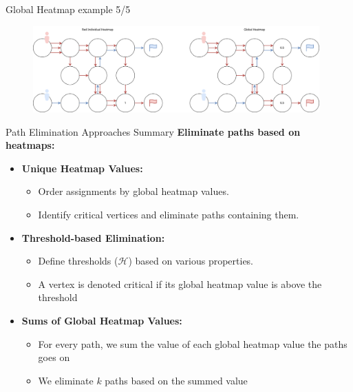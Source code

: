 \begin{frame}{Global Heatmap example 5/5}
    \begin{figure}[H]
        \centering
        \includegraphics[width=11cm]{img/global_heatmap_p5.drawio.png}
    \end{figure}
\end{frame}



\begin{frame}{Path Elimination Approaches Summary}
    \textbf{Eliminate paths based on heatmaps:}

            \begin{itemize}
                \item \textbf{Unique Heatmap Values:}
                    \begin{itemize}
                        \item Order assignments by global heatmap values.
                        \item Identify critical vertices and eliminate paths containing them.
                    \end{itemize}
                \item \textbf{Threshold-based Elimination:}
                    \begin{itemize}
                        \item Define thresholds (\(\mathcal{H}\)) based on various properties.
                        \item A vertex is denoted critical if its global heatmap value is above the threshold
                    \end{itemize}
                \item \textbf{Sums of Global Heatmap Values:}
                    \begin{itemize}
                        \item For every path, we sum the value of each global heatmap value the paths goes on
                        \item We eliminate \(k\) paths based on the summed value 
                    \end{itemize}
            \end{itemize}
\end{frame}




